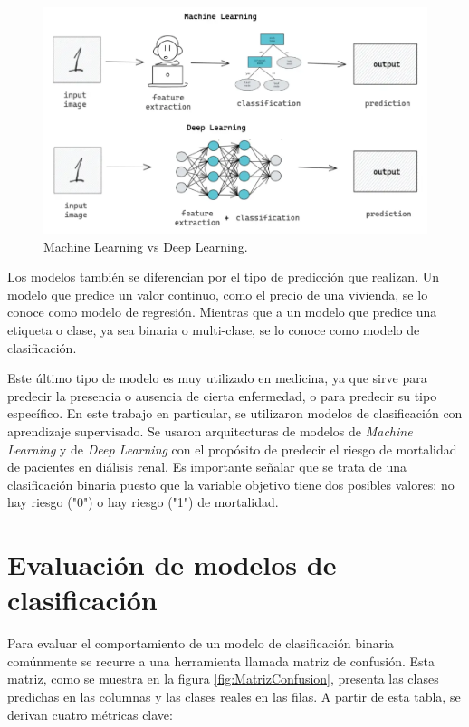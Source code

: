 \begin{figure}[htpb]
\centering 
\includegraphics[width=.95\textwidth]{./Figures/ML vs DL.png}
\caption{Machine Learning vs Deep Learning.}
\label{fig:diagMLvsDL}
\end{figure}

Los modelos también se diferencian por el tipo de predicción que realizan. Un modelo que predice un valor continuo, como el precio de una vivienda, se lo conoce como modelo de regresión. Mientras que a un modelo que predice una etiqueta o clase, ya sea binaria o multi-clase, se lo conoce como modelo de clasificación. 

Este último tipo de modelo es muy utilizado en medicina, ya que sirve para predecir la presencia o ausencia de cierta enfermedad, o para predecir su tipo específico.
En este trabajo en particular, se utilizaron modelos de clasificación con aprendizaje supervisado. Se usaron arquitecturas de modelos de \textit{Machine Learning} y de \textit{Deep Learning} con el propósito de predecir el riesgo de mortalidad de pacientes en diálisis renal. Es importante señalar que se trata de una clasificación binaria puesto que la variable objetivo tiene dos posibles valores: no hay riesgo ("0") o hay riesgo ("1") de mortalidad.

\section{Evaluación de modelos de clasificación}

Para evaluar el comportamiento de un modelo de clasificación binaria comúnmente se recurre a una herramienta llamada matriz de confusión. Esta matriz, como se muestra en la figura \ref{fig:MatrizConfusion}, presenta las clases predichas en las columnas y las clases reales en las filas. A partir de esta tabla, se derivan cuatro métricas clave:


